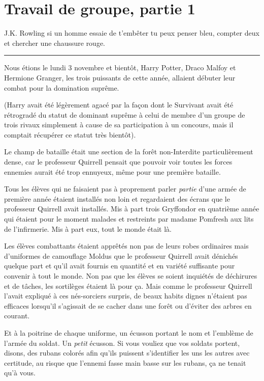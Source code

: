 
\chapter{Travail de groupe, partie 1}

J.K. Rowling si un homme essaie de t'embêter tu peux penser bleu, compter deux et chercher une chaussure rouge.
\par\noindent\rule{\textwidth}{0.4pt}
Nous étions le lundi 3 novembre et bientôt, Harry Potter, Draco Malfoy et Hermione Granger, les trois puissants de cette année, allaient débuter leur combat pour la domination suprême.

(Harry avait été légèrement agacé par la façon dont le Survivant avait été rétrogradé du statut de dominant suprême à celui de membre d'un groupe de trois rivaux simplement à cause de sa participation à un concours, mais il comptait récupérer ce statut très bientôt).

Le champ de bataille était une section de la forêt non-Interdite particulièrement dense, car le professeur Quirrell pensait que pouvoir voir toutes les forces ennemies aurait été trop ennuyeux, même pour une première bataille.

Tous les élèves qui ne faisaient pas à proprement parler \emph{partie}  d'une armée de première année étaient installés non loin et regardaient des écrans que le professeur Quirrell avait installés. Mis à part trois Gryffondor en quatrième année qui étaient pour le moment malades et restreints par madame Pomfresh aux lits de l'infirmerie. Mis à part eux, tout le monde était là.

Les élèves combattants étaient apprêtés non pas de leurs robes ordinaires mais d'uniformes de camouflage Moldus que le professeur Quirrell avait dénichés quelque part et qu'il avait fournis en quantité et en variété suffisante pour convenir à tout le monde. Non pas que les élèves se soient inquiétés de déchirures et de tâches, les sortilèges étaient là pour ça. Mais comme le professeur Quirrell l'avait expliqué à ces nés-sorciers surpris, de beaux habits dignes n'étaient pas efficaces lorsqu'il s'agissait de se cacher dans une forêt ou d'éviter des arbres en courant.

Et à la poitrine de chaque uniforme, un écusson portant le nom et l'emblème de l'armée du soldat. Un \emph{petit}  écusson. Si vous vouliez que vos soldats portent, disons, des rubans colorés afin qu'ils puissent s'identifier les uns les autres avec certitude, au risque que l'ennemi fasse main basse sur les rubans, ça ne tenait qu'à vous.


